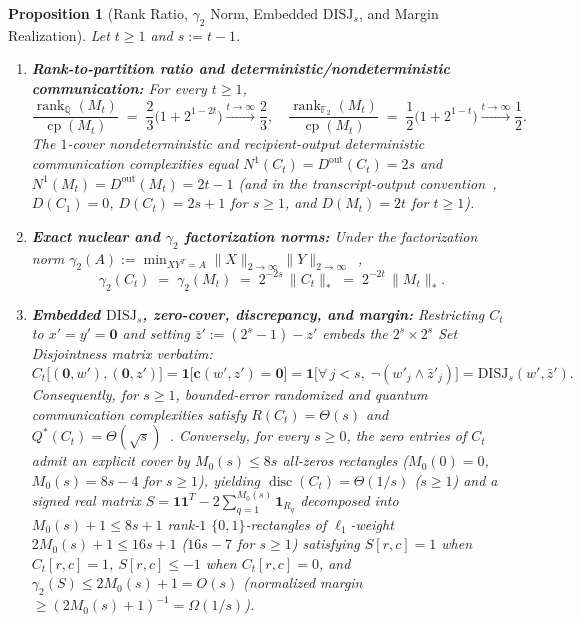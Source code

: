 \documentclass[11pt,reqno]{amsart}
\newtheorem{proposition}[theorem]{Proposition}
\theoremstyle{definition}
\theoremstyle{remark}
\DeclareMathOperator{\cp}{cp}
\DeclareMathOperator{\rk}{rank}
\DeclareMathOperator{\disc}{disc}
\newcommand{\FF}{\mathbb{F}}
\newcommand{\QQ}{\mathbb{Q}}
\newcommand{\ind}{\mathbf{1}}
\newcommand{\bv}{\mathbf{c}}
\newcommand{\zero}{\mathbf{0}}
\newcommand{\DISJ}{\mathrm{DISJ}}
\numberwithin{equation}{section}
\begin{document}
\begin{proposition}[Rank Ratio, $\gamma_2$ Norm, Embedded $\DISJ_s$, and Margin Realization]
  \label{prop:corollaries}
  Let $t \ge 1$ and $s := t - 1$.
  \begin{enumerate}[leftmargin=2em,label=\textup{(\alph*)}]
    \item \textbf{Rank-to-partition ratio and deterministic/nondeterministic communication:} For every $t \ge 1$,
    \[
      \frac{\rk_{\QQ}(M_t)}{\cp(M_t)} \;=\; \frac{2}{3}\bigl(1 + 2^{1 - 2t}\bigr) \xrightarrow{t \to \infty} \frac{2}{3}, \quad
      \frac{\rk_{\FF_2}(M_t)}{\cp(M_t)} \;=\; \frac{1}{2}\bigl(1 + 2^{1 - t}\bigr) \xrightarrow{t \to \infty} \frac{1}{2}.
    \]
    The $1$-cover nondeterministic and recipient-output deterministic communication complexities equal $N^1(C_t) = D^{\mathrm{out}}(C_t) = 2s$ and $N^1(M_t) = D^{\mathrm{out}}(M_t) = 2t - 1$ (and in the transcript-output convention~\cite{KN97}, $D(C_1) = 0$, $D(C_t) = 2s + 1$ for $s \ge 1$, and $D(M_t) = 2t$ for $t \ge 1$).

    \item \textbf{Exact nuclear and $\gamma_2$ factorization norms:} Under the factorization norm $\gamma_2(A) := \min_{X Y^T = A} \|X\|_{2 \to \infty}\|Y\|_{2 \to \infty}$~\cite{LS09},
    \begin{equation}
      \label{eq:gamma2}
      \gamma_2(C_t) \;=\; \gamma_2(M_t) \;=\; 2^{-2s}\,\|C_t\|_* \;=\; 2^{-2t}\,\|M_t\|_*.
    \end{equation}

    \item \textbf{Embedded $\DISJ_s$, zero-cover, discrepancy, and margin:} Restricting $C_t$ to $x' = y' = \zero$ and setting $\bar{z}' := (2^s - 1) - z'$ embeds the $2^s \times 2^s$ Set Disjointness matrix verbatim:
    \begin{equation}
      \label{eq:disj-embed}
      C_t\bigl[(\zero, w'), (\zero, z')\bigr] = \ind\bigl[\bv(w', z') = \zero\bigr] = \ind\bigl[\forall\, j < s,\; \neg(w'_j \land \bar{z}'_j)\bigr] = \DISJ_s(w', \bar{z}').
    \end{equation}
    Consequently, for $s \ge 1$, bounded-error randomized and quantum communication complexities satisfy $R(C_t) = \Theta(s)$ and $Q^*(C_t) = \Theta(\sqrt{s})$~\cite{Raz92,Raz03,AA05}. Conversely, for every $s \ge 0$, the zero entries of $C_t$ admit an explicit cover by $M_0(s) \le 8s$ all-zeros rectangles ($M_0(0) = 0$, $M_0(s) = 8s - 4$ for $s \ge 1$), yielding $\disc(C_t) = \Theta(1/s)$ ($s \ge 1$) and a signed real matrix $S = \ind\ind^T - 2\sum_{q=1}^{M_0(s)} \ind_{R_q}$ decomposed into $M_0(s) + 1 \le 8s + 1$ rank-$1$ $\{0, 1\}$-rectangles of $\ell_1$-weight $2 M_0(s) + 1 \le 16s + 1$ ($16s - 7$ for $s \ge 1$) satisfying $S[r, c] = 1$ when $C_t[r, c] = 1$, $S[r, c] \le -1$ when $C_t[r, c] = 0$, and $\gamma_2(S) \le 2 M_0(s) + 1 = O(s)$ (normalized margin $\ge (2 M_0(s) + 1)^{-1} = \Omega(1/s)$).
  \end{enumerate}
\end{proposition}
\end{document}

